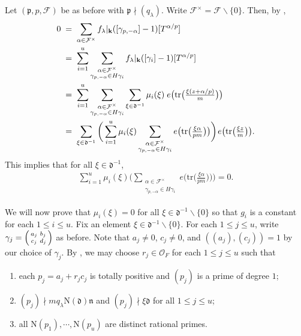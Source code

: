 \documentclass[11pt]{amsart}
\theoremstyle{remark}
\newcommand\sm[1]{\begin{psmallmatrix}#1\end{psmallmatrix}}
\newcommand\mbf[1]{\mathbf{#1}}
\newcommand\cl[1]{\mathcal{#1}}
\newcommand\fr[1]{\mathfrak{#1}}
\newcommand{\clo}{\mathcal{O}}
\newcommand{\bslash}{\backslash}
\newcommand{\eq}{\;=\;}
\def\thin{{\hskip 1pt}}
\newcommand{\N}{\mathrm{N}}
\newcommand{\tr}{\mathrm{tr}}
\begin{document}
Let $(\fr{p},p,\cl{F})$ be as before with $\fr{p}\nmid(q_\lambda)$. Write $\cl{F}^\times=\cl{F}\bslash\{0\}$. Then, by ,
\begin{align*}
    0&\eq\sum_{\alpha\in\cl{F}^\times}f_\lambda|_\mbf{k}([\gamma_{p,-\alpha}]-1)[T^{\alpha/p}] \\
    &\eq\sum_{i=1}^u\sum_{\substack{\alpha\in\cl{F}^\times \\ \gamma_{p,-\alpha}\in H\gamma_i}}f_\lambda|_\mbf{k}([\gamma_i]-1)[T^{\alpha/p}] \\
    &\eq\sum_{i=1}^u\sum_{\substack{\alpha\in\cl{F}^\times \\ \gamma_{p,-\alpha}\in H\gamma_i}}\sum_{\xi\in\fr{d}^{-1}}\mu_i(\xi)\; e\big(\tr\big(\tfrac{\xi(z+\alpha/p)}{m}\big)\big) \\
    &\eq\sum_{\xi\in\fr{d}^{-1}}\bigg(\sum_{i=1}^u\mu_i(\xi)\sum_{\substack{\alpha\in\cl{F}^\times \\ \gamma_{p,-\alpha}\in H\gamma_i}}e\big(\tr\big(\tfrac{\xi\alpha}{pm}\big)\big)\bigg)\thin e\big(\tr\big(\tfrac{\xi z}{m}\big)\big).
\end{align*}
This implies that for all $\xi\in\fr{d}^{-1}$,
\begin{align}
\label{lambdaexposum}
    \sum_{i=1}^u\mu_i(\xi)\bigg(\sum_{\substack{\alpha\in\cl{F}^\times \\ \gamma_{p,-\alpha}\in H\gamma_i}}e\big(\tr\big(\tfrac{\xi\alpha}{pm}\big)\big)\bigg)=0.
\end{align}

We will now prove that $\mu_i(\xi)=0$ for all $\xi\in\fr{d}^{-1}\bslash\{0\}$ so that $g_i$ is a constant for each $1\leq i\leq u$. Fix an element $\xi\in\fr{d}^{-1}\bslash\{0\}$. For each $1\leq j\leq u$, write $\gamma_j=\sm{a_j&b_j\\c_j&d_j}$ as before. Note that $a_j\neq 0$, $c_j\neq 0$, and $((a_j),(c_j))=1$ by our choice of $\gamma_j$. By , we may choose $r_j\in\clo_F$ for each $1\leq j\leq u$ such that
\begin{enumerate}[label=(P\arabic*)]
    \item each $p_j=a_j+r_jc_j$ is totally positive and $(p_j)$ is a prime of degree $1$;
    \item $(p_j)\nmid mq_\lambda\N(\fr{d})\fr{n}$ and $(p_j)\nmid\xi\fr{d}$ for all $1\leq j\leq u$;
    \item all $\N(p_1),\cdots,\N(p_u)$ are distinct rational primes.
\end{enumerate}
\end{document}
